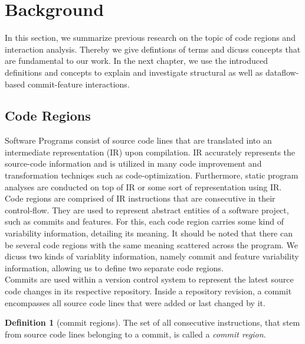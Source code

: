 \section{Background}\label{ch:background}

In this section, we summarize previous research on the topic of code regions and interaction analysis.
Thereby we give defintions of terms and dicuss concepts that are fundamental to our work.
In the next chapter, we use the introduced definitions and concepts to explain and investigate structural as well as dataflow-based commit-feature interactions.

\subsection{Code Regions}\label{ch:code_regions}
Software Programs consist of source code lines that are translated into an intermediate representation (IR) upon compilation.
IR accurately represents the source-code information and is utilized in many code improvement and transformation techniqes such as code-optimization.
Furthermore, static program analyses are conducted on top of IR or some sort of representation using IR. \\
Code regions are comprised of IR instructions that are consecutive in their control-flow. 
They are used to represent abstract entities of a software project, such as commits and features.
For this, each code region carries some kind of variability information, detailing its meaning.
It should be noted that there can be several code regions with the same meaning scattered across the program.
We dicuss two kinds of variablity information, namely commit and feature variability information, allowing us to define two separate code regions. \\
Commits are used within a version control system to represent the latest source code changes in its respective repository.
Inside a repository revision, a commit encompasses all source code lines that were added or last changed by it. 

\theoremstyle{definition}
\newtheorem{definition}{Definition}
\begin{definition}[commit regions]\label{def:commit_regions}
	The set of all consecutive instructions, that stem from source code lines belonging to a commit, is called a \emph{commit region}.
\end{definition}

